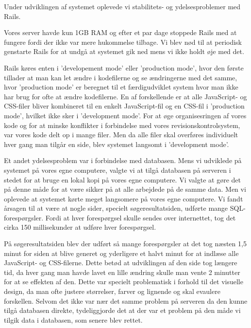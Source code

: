 Under udviklingen af systemet oplevede vi stabilitets- og ydelsesproblemer med Rails.

Vores server havde kun 1GB RAM og efter et par dage stoppede Rails med at fungere fordi der ikke var mere hukommelse tilbage. Vi blev nød til at periodisk genstarte Rails  for at undgå at systemet gik ned mens vi ikke holdt øje med det.

Rails køres enten i 'developement mode' eller 'production mode', hvor den første tillader at man kan let ændre i kodefilerne og se ændringerne med det samme, hvor 'production mode' er beregnet til et færdigudviklet system hvor man ikke har brug for ofte at ændre kodefilerne. En af forskellende er at alle JavaScript- og CSS-filer bliver kombineret til en enkelt JavaScript-fil og en CSS-fil i 'production mode', hvilket ikke sker i 'development mode'. For at øge organisesringen af vores kode og for at minske konflikter i forbindelse med vores revisionskontrolsystem, var vores kode delt op i mange filer. Men da alle filer skal overføres individuelt hver gang man tilgår en side, blev systemet langsomt i 'development mode'.

Et andet ydelsesproblem var i forbindelse med databasen. Mens vi udviklede på systemet på vores egne computere, valgte vi at tilgå databasen på serveren i stedet for at bruge en lokal kopi på vores egne computere. Vi valgte at gøre det på denne måde for at være sikker på at alle arbejdede på de samme data. Men vi oplevede at systemet kørte meget langsomere på vores egne computere. Vi fandt årsagen til at være at nogle sider, specielt søgeresultatsiden, udførte mange SQL-forespørgsler. Fordi at hver forespørgsel skulle sendes over internettet, tog det cirka 150 millisekunder at udføre hver forespørgsel.

På søgeresultatsiden blev der udført så mange forespørgsler at det tog næsten 1,5 minut for siden at blive generet og yderligere et halvt minut for at indlæse alle JavaScript- og CSS-filerne. Dette betød at udviklingen af den side tog længere tid, da hver gang man havde lavet en lille ændring skulle man vente 2 minutter for at se effekten af den. Dette var specielt problematisk i forhold til det visuelle design, da man ofte justere størrelser, farver og lignende og skal evaulere forskellen. Selvom det ikke var nær det samme problem på serveren da den kunne tilgå databasen direkte, tydeliggjorde det at der var et problem på den måde vi tilgik data i databasen, som senere blev rettet.


